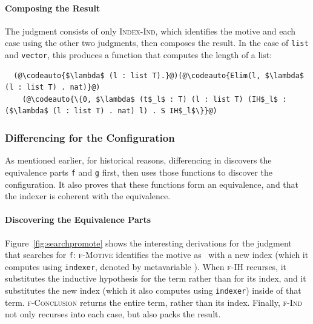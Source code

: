 \paragraph{Composing the Result}
The  judgment consists of only \textsc{Index-Ind}, which 
identifies the motive and each case using the other two judgments, then composes the result. In the case of \lstinline{list} and \lstinline{vector},
this produces a function that computes the length of a list:
\begin{lstlisting}
  (@\codeauto{$\lambda$ (l : list T).}@)(@\codeauto{Elim(l, $\lambda$ (l : list T) . nat)}@) 
    (@\codeauto{\{0, $\lambda$ (t$_l$ : T) (l : list T) (IH$_l$ : ($\lambda$ (l : list T) . nat) l) . S IH$_l$\}}@)
\end{lstlisting}

\subsubsection{Differencing for the Configuration}

As mentioned earlier, for historical reasons, differencing in \toolnamec discovers the equivalence parts \lstinline{f} and \lstinline{g} first, then uses
those functions to discover the configuration.
It also proves that these functions form an equivalence, and that the indexer is coherent with the equivalence.

\paragraph{Discovering the Equivalence Parts}
Figure~\ref{fig:searchpromote} shows the interesting derivations for the judgment 
that searches for \lstinline{f}:
\textsc{f-Motive} identifies the motive 
as \B\ with a new index (which it computes using \lstinline{indexer}, denoted by metavariable \smallmath{$\pi$}).
When \textsc{f-IH} recurses, it substitutes the inductive hypothesis for the term rather than
for its index, and it substitutes the new index (which it also computes using \lstinline{indexer}) inside of that term.
\textsc{f-Conclusion} returns the entire term, rather than its index.
Finally, \textsc{f-Ind} not only recurses into each case, but also packs the result.


